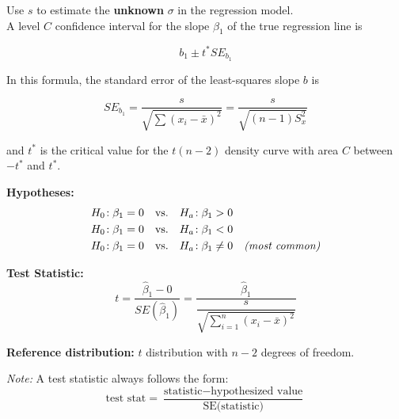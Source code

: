 Use $s$ to estimate the \textbf{unknown} $\sigma$ in the regression model.\\

A level $C$ confidence interval for the slope $\beta_1$ of the true regression line is

\[
b_1 \pm t^* SE_{b_1}
\]

In this formula, the standard error of the least-squares slope $b$ is

\[
SE_{b_1} = \frac{s}{\sqrt{\sum (x_i - \bar{x})^2}} = \frac{s}{\sqrt{(n - 1) S_x^2}}
\]

and $t^*$ is the critical value for the $t(n - 2)$ density curve with area $C$ between $-t^*$ and $t^*$.

\begin{tcolorbox}[
  colback=yellow!5,
  colframe=yellow!50!black,
  title={Hypothesis Test on the Slope $\beta_1$},
  boxrule=0.4pt, sharp corners, breakable
]

\textbf{Hypotheses:}
\begin{align*}
H_0\!: \beta_1 = 0 \quad & \text{vs.} \quad H_a\!: \beta_1 > 0 \\
H_0\!: \beta_1 = 0 \quad & \text{vs.} \quad H_a\!: \beta_1 < 0 \\
H_0\!: \beta_1 = 0 \quad & \text{vs.} \quad H_a\!: \beta_1 \neq 0 \quad \text{\textit{(most common)}}
\end{align*}

\vspace{0.75em}
\textbf{Test Statistic:}
\[
t = \frac{\hat{\beta}_1 - 0}{SE(\hat{\beta}_1)} = \frac{\hat{\beta}_1}{\dfrac{s}{\sqrt{\sum_{i=1}^n (x_i - \bar{x})^2}}}
\]

\vspace{0.75em}
\textbf{Reference distribution:} $t$ distribution with $n - 2$ degrees of freedom.

\vspace{1em}
\textit{Note:} A test statistic always follows the form:
\[
\text{test stat} = \frac{\text{statistic} - \text{hypothesized value}}{\text{SE(statistic)}}
\]

\end{tcolorbox}

